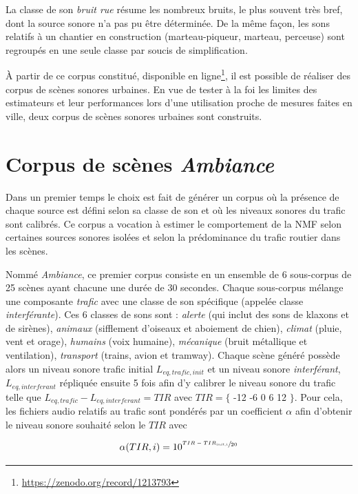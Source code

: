 

La classe de son \textit{bruit rue} résume les nombreux bruits, le plus souvent très bref, dont la source sonore n'a pas pu être déterminée. De la même façon, les sons relatifs à un chantier en construction (marteau-piqueur, marteau, perceuse) sont regroupés en une seule classe par soucis de simplification.

À partir de ce corpus constitué, disponible en ligne\footnote{\url{https://zenodo.org/record/1213793}}, il est possible de réaliser des corpus de scènes sonores urbaines. En vue de tester à la foi les limites des estimateurs et leur performances lors d'une utilisation proche de mesures faites en ville, deux corpus de scènes sonores urbaines sont construits. 

\section{Corpus de scènes \textit{Ambiance}}

Dans un premier temps le choix est fait de générer un corpus où la présence de chaque source est défini selon sa classe de son et où les niveaux sonores du trafic sont calibrés. Ce corpus a vocation à estimer le comportement de la NMF selon certaines sources sonores isolées et selon la prédominance du trafic routier dans les scènes. 

Nommé \textit{Ambiance}, ce premier corpus consiste en un ensemble de 6 sous-corpus de 25 scènes ayant chacune une durée de 30 secondes. Chaque sous-corpus mélange une composante \textit{trafic} avec une classe de son spécifique (appelée classe \textit{interférante}). 
Ces 6 classes de sons sont : \textit{alerte} (qui inclut des sons de klaxons et de sirènes), \textit{animaux} (sifflement d'oiseaux et aboiement de chien), \textit{climat} (pluie, vent et orage), \textit{humains} (voix humaine), \textit{mécanique} (bruit métallique et ventilation), \textit{transport} (trains, avion et tramway). 
Chaque scène généré possède alors un niveau sonore trafic initial $L_{eq,trafic,init}$ et un niveau sonore \textit{interférant}, $L_{eq,interferant}$ répliquée ensuite 5 fois afin d'y calibrer le niveau sonore du trafic telle que $L_{eq,trafic} - L_{eq,interferant} = TIR$ avec $TIR = \lbrace$ -12 -6 0 6 12 $\rbrace$. Pour cela, les fichiers audio relatifs au trafic sont pondérés par un coefficient $\alpha$ afin d'obtenir le niveau sonore souhaité selon le $TIR$ avec 

\begin{equation}
\alpha(TIR,i) = 10^{\sfrac{TIR-TIR_{init,i}}{20}}
\end{equation}

